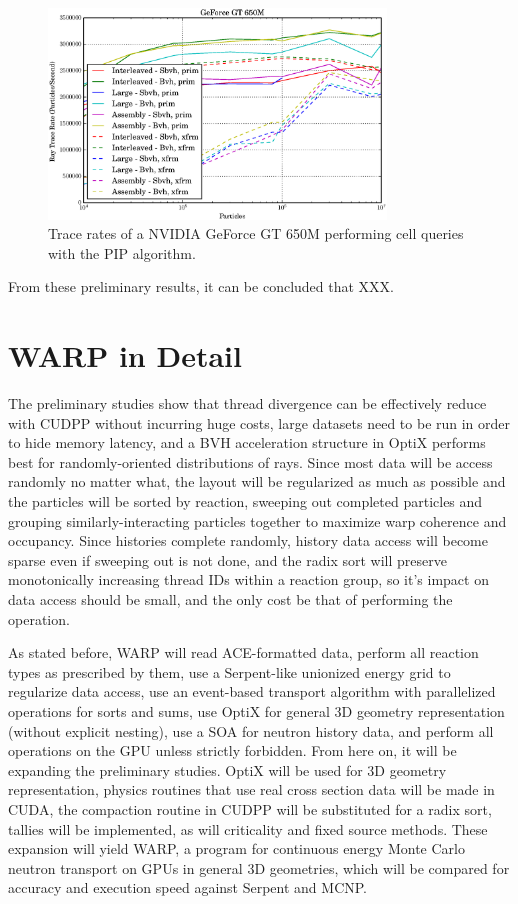 \begin{figure}[h!] 
  \centering
    \includegraphics[width=0.8\textwidth]{graphics/prelim_optix_G650M.eps}
     \caption{Trace rates of a NVIDIA GeForce GT 650M performing cell queries with the PIP algorithm. \label{prelim_optix_G650M} }
\end{figure}

From these preliminary results, it can be concluded that XXX.



\section{WARP in Detail}

The preliminary studies show that thread divergence can be effectively reduce with CUDPP without incurring huge costs, large datasets need to be run in order to hide memory latency, and a BVH acceleration structure in OptiX performs best for randomly-oriented distributions of rays.  Since most data will be access randomly no matter what, the layout will be regularized as much as possible and the particles will be sorted by reaction, sweeping out completed particles and grouping similarly-interacting particles together to maximize warp coherence and occupancy.  Since histories complete randomly, history data access will become sparse even if sweeping out is not done, and the radix sort will preserve monotonically increasing thread IDs within a reaction group, so it's impact on data access should be small, and the only cost be that of performing the operation.

As stated before, WARP will read ACE-formatted data, perform all reaction types as prescribed by them, use a Serpent-like unionized energy grid to regularize data access, use an event-based transport algorithm with parallelized operations for sorts and sums, use OptiX for general 3D geometry representation (without explicit nesting), use a SOA for neutron history data, and perform all operations on the GPU unless strictly forbidden.  From here on, it will be expanding the preliminary studies.  OptiX will be used for 3D geometry representation, physics routines that use real cross section data will be made in CUDA, the compaction routine in CUDPP will be substituted for a radix sort, tallies will be implemented, as will criticality and fixed source methods.  These expansion will yield WARP, a program for continuous energy Monte Carlo neutron transport on GPUs in general 3D geometries, which will be compared for accuracy and execution speed against Serpent and MCNP.

